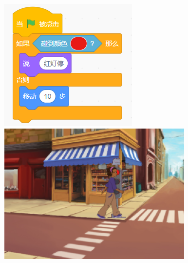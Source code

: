 \documentclass[10pt, a4paper]{article}
\begin{document}
\begin{enumerate}
        \begin{figure}[htbp]
            \centering
            \begin{minipage}[t]{.32\textwidth}
                \centering
                \begin{minipage}[t]{.48\textwidth}
                    \centering
                    \includegraphics[width=\textwidth]{11-2.png}
                \end{minipage}
                \begin{minipage}[t]{.5\textwidth}
                    \centering
                    \includegraphics[width=\textwidth]{11-3.png}

\end{minipage}
\end{minipage}
\end{figure}
\end{enumerate}
\end{document}
